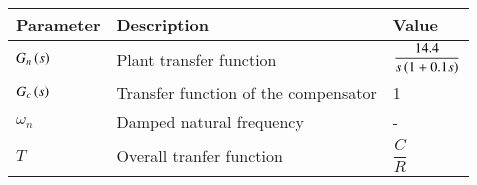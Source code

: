 \renewcommand{\arraystretch}{2}
\begin{tabular}{|p{2cm}|p{3cm}|p{2cm}|}
\hline 
\setlength{\tabcolsep}{1pt}
\textbf{Parameter}  &\textbf{Description} &\textbf{Value} \\
\hline
$G_n\left(s\right)$ & Plant transfer function & $\dfrac{14.4}{s\left(1+0.1s\right)}$ \\
\hline
$G_c\left(s\right)$ &Transfer function of the compensator  & 1 \\
\hline
$\omega_n$ & Damped natural frequency& - \\
\hline
$T$& Overall tranfer function & $\dfrac{C}{R}$\\
\hline
\end{tabular}
